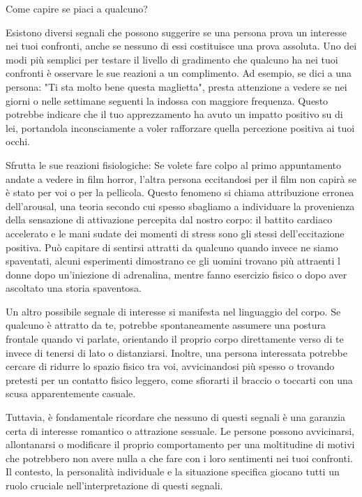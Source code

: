 \documentclass[12pt]{book} %
\begin{document}
\begin{mdframed}[linewidth=1pt]
Come capire se piaci a qualcuno?

Esistono diversi segnali che possono suggerire se una persona prova un interesse nei tuoi confronti, anche se nessuno di essi costituisce una prova assoluta. Uno dei modi più semplici per testare il livello di gradimento che qualcuno ha nei tuoi confronti è osservare le sue reazioni a un complimento. Ad esempio, se dici a una persona: "Ti sta molto bene questa maglietta", presta attenzione a vedere se nei giorni o nelle settimane seguenti la indossa con maggiore frequenza. Questo potrebbe indicare che il tuo apprezzamento ha avuto un impatto positivo su di lei, portandola inconsciamente a voler rafforzare quella percezione positiva ai tuoi occhi.

Sfrutta le sue reazioni fisiologiche: Se volete fare colpo al primo appuntamento andate a vedere in film horror,
l'altra persona eccitandosi per il film non capirà se è stato per voi o per la pellicola. Questo fenomeno si chiama
attribuzione erronea dell'arousal, una teoria secondo cui spesso sbagliamo a individuare la provenienza della
sensazione di attivazione percepita dal nostro corpo: il battito cardiaco accelerato e le mani sudate dei momenti di
stress sono gli stessi dell'eccitazione positiva. Può capitare di sentirsi attratti da qualcuno quando invece ne siamo
spaventati, alcuni esperimenti dimostrano ce gli uomini trovano più attraenti l donne dopo un'iniezione di
adrenalina, mentre fanno esercizio fisico o dopo aver
ascoltato una storia spaventosa.

Un altro possibile segnale di interesse si manifesta nel linguaggio del corpo. Se qualcuno è attratto da te, potrebbe spontaneamente assumere una postura frontale quando vi parlate, orientando il proprio corpo direttamente verso di te invece di tenersi di lato o distanziarsi. Inoltre, una persona interessata potrebbe cercare di ridurre lo spazio fisico tra voi, avvicinandosi più spesso o trovando pretesti per un contatto fisico leggero, come sfiorarti il braccio o toccarti con una scusa apparentemente casuale.

Tuttavia, è fondamentale ricordare che nessuno di questi segnali è una garanzia certa di interesse romantico o attrazione sessuale. Le persone possono avvicinarsi, allontanarsi o modificare il proprio comportamento per una moltitudine di motivi che potrebbero non avere nulla a che fare con i loro sentimenti nei tuoi confronti. Il contesto, la personalità individuale e la situazione specifica giocano tutti un ruolo cruciale nell’interpretazione di questi segnali.
\end{mdframed}
\end{document}

